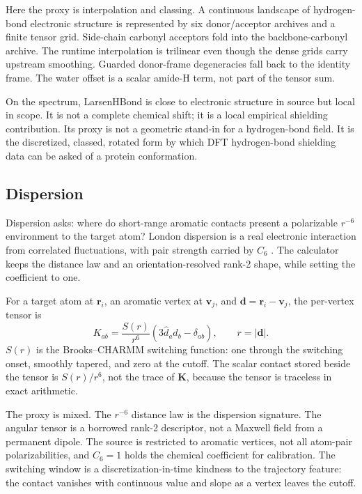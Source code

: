 \documentclass[11pt]{article}
\begin{document}
Here the proxy is interpolation and classing. A continuous landscape of
hydrogen-bond electronic structure is represented by six donor/acceptor
archives and a finite tensor grid. Side-chain carbonyl acceptors fold into the
backbone-carbonyl archive. The runtime interpolation is trilinear even though
the dense grids carry upstream smoothing. Guarded donor-frame degeneracies fall
back to the identity frame. The water offset is a scalar amide-H term, not part
of the tensor sum.

On the spectrum, LarsenHBond is close to electronic structure in source but
local in scope. It is not a complete chemical shift; it is a local empirical
shielding contribution. Its proxy is not a geometric stand-in for a
hydrogen-bond field. It is the discretized, classed, rotated form by which DFT
hydrogen-bond shielding data can be asked of a protein conformation.

\subsection{Dispersion}

Dispersion asks: where do short-range aromatic contacts present a polarizable
\(r^{-6}\) environment to the target atom? London dispersion is a real
electronic interaction from correlated fluctuations, with pair strength carried
by \(C_6\) \cite{london1937,grimme2010,wagner2015}. The calculator keeps the
distance law and an orientation-resolved rank-2 shape, while setting the
coefficient to one.

For a target atom at \(\bm r_i\), an aromatic vertex at \(\bm v_j\), and
\(\bm d=\bm r_i-\bm v_j\), the per-vertex tensor is
\[
  K_{ab}
  =
  \frac{S(r)}{r^6}
  \left(3\hat d_a\hat d_b-\delta_{ab}\right),
  \qquad
  r=|\bm d|.
\]
\(S(r)\) is the Brooks--CHARMM switching function: one through the switching
onset, smoothly tapered, and zero at the cutoff. The scalar contact stored
beside the tensor is \(S(r)/r^6\), not the trace of \(\bm K\), because the
tensor is traceless in exact arithmetic.

The proxy is mixed. The \(r^{-6}\) distance law is the dispersion signature.
The angular tensor is a borrowed rank-2 descriptor, not a Maxwell field from a
permanent dipole. The source is restricted to aromatic vertices, not all
atom-pair polarizabilities, and \(C_6=1\) holds the chemical coefficient for
calibration. The switching window is a discretization-in-time kindness to the
trajectory feature: the contact vanishes with continuous value and slope as a
vertex leaves the cutoff.
\end{document}
